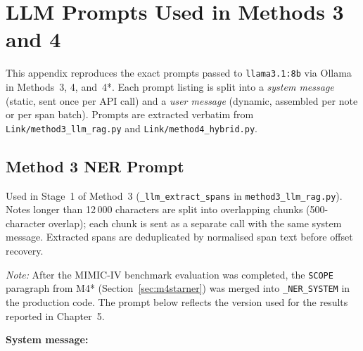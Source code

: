 \documentclass{EPL-master-thesis-covers-EN}
\begin{document}
    \nocite{*} %

    \appendix

    \chapter{LLM Prompts Used in Methods 3 and 4}
    \label{app:prompts}

    This appendix reproduces the exact prompts passed to \texttt{llama3.1:8b} via Ollama
    in Methods~3, 4, and~4*. Each prompt listing is split into a \textit{system message}
    (static, sent once per API call) and a \textit{user message} (dynamic, assembled per
    note or per span batch). Prompts are extracted verbatim from
    \texttt{Link/method3\_llm\_rag.py} and \texttt{Link/method4\_hybrid.py}.

    \section{Method 3 NER Prompt}
    \label{sec:m3ner}

    Used in Stage~1 of Method~3 (\texttt{\_llm\_extract\_spans} in
    \texttt{method3\_llm\_rag.py}). Notes longer than 12\,000 characters are split into
    overlapping chunks (500-character overlap); each chunk is sent as a separate call with
    the same system message. Extracted spans are deduplicated by normalised span text before
    offset recovery.

    \smallskip\noindent\textit{Note:} After the MIMIC-IV benchmark evaluation was completed,
    the \texttt{SCOPE} paragraph from M4* (Section~\ref{sec:m4starner}) was merged into
    \texttt{\_NER\_SYSTEM} in the production code. The prompt below reflects the version
    used for the results reported in Chapter~5.

    \medskip
    \noindent\textbf{System message:}
\end{document}

